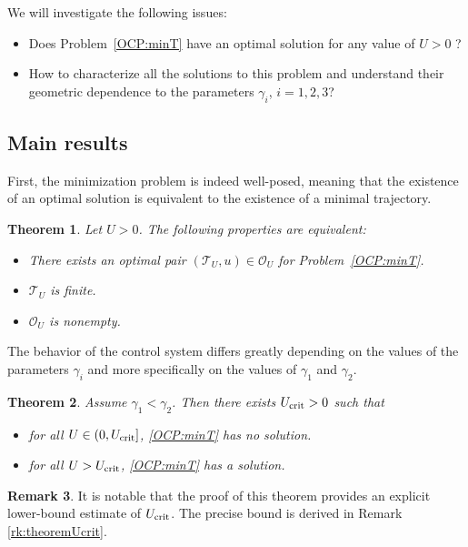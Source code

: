 \documentclass[10pt]{amsart}
\newtheorem{theorem}{Theorem}
\theoremstyle{definition}
\newtheorem{remark}[theorem]{Remark}
\begin{document}
We will investigate the following issues:
\begin{itemize}
\item Does Problem~\eqref{OCP:minT} have an optimal solution for any value of $U >0$ ?
\item How to characterize all the solutions to this problem and understand their geometric dependence to the parameters $\gamma_i$, $i=1,2,3$?
\end{itemize}

\subsection{Main results}\label{sec:mainRes}

First, the minimization problem is indeed well-posed, meaning that the existence of an optimal solution is equivalent to the existence of a minimal trajectory.

\begin{theorem} \label{th:ex_min}
Let $U > 0$. The following properties are equivalent:
\begin{itemize}
\item[(i)] There exists an optimal pair $(\mathcal{T}_{U}, u) \in \mathcal{O}_{U }$ for Problem~\eqref{OCP:minT}.
\item[(ii)] $\mathcal{T}_{U}$ is finite.
\item[(iii)] $\mathcal{O}_{U }$ is nonempty.
\end{itemize}
\end{theorem}

The behavior of the control system differs greatly depending on the values of the parameters $\gamma_i$ and more specifically on the values of $\gamma_1$ and $\gamma_2$.

\begin{theorem} \label{th:ex_U_crit}
Assume $\gamma_1 < \gamma_2$. Then there exists $U_\textnormal{crit} > 0$ such that
\begin{itemize}
\item for all $U \in (0, U_\textnormal{crit}]$, \eqref{OCP:minT} has no solution.
\item for all $U > U_\textnormal{crit}$, \eqref{OCP:minT} has a solution.
\end{itemize}
\end{theorem}

\begin{remark}
It is notable that the proof of this theorem provides an explicit lower-bound estimate of $U_\textnormal{crit}$. The precise bound is derived in Remark \ref{rk:theoremUcrit}.
\end{remark}
\end{document}
